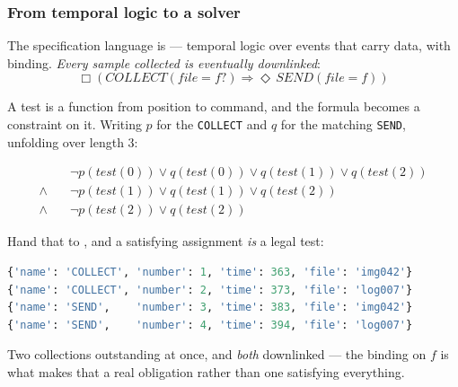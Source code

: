 \begin{frame}[fragile]
  \frametitle{From temporal logic to a solver} \small

The specification language is {\bf \matl{}} --- temporal logic over events that
carry data, with binding. {\em Every sample collected is eventually downlinked}:
\[
\Box (\mathit{COLLECT}(file=f?) \Rightarrow \Diamond\, \mathit{SEND}(file=f))
\]

\pause
\vspace{-0.1cm}

A test is a function from position to command, and the formula becomes a constraint
on it. Writing $p$ for the {\tt COLLECT} and $q$ for the matching {\tt SEND},
unfolding over length 3:

\vspace{-0.2cm}

\begin{align*}
&\neg p(test(0)) \vee q(test(0)) \vee q(test(1)) \vee q(test(2)) \\
\wedge\quad &\neg p(test(1)) \vee q(test(1)) \vee q(test(2)) \\
\wedge\quad &\neg p(test(2)) \vee q(test(2))
\end{align*}

\vspace{-0.15cm}

\pause

Hand that to {\bf \zthree{}}, and a satisfying assignment {\em is} a legal test:

\begin{lstlisting}[language=python]
{'name': 'COLLECT', 'number': 1, 'time': 363, 'file': 'img042'}
{'name': 'COLLECT', 'number': 2, 'time': 373, 'file': 'log007'}
{'name': 'SEND',    'number': 3, 'time': 383, 'file': 'img042'}
{'name': 'SEND',    'number': 4, 'time': 394, 'file': 'log007'}
\end{lstlisting}

\vspace{-0.15cm}

Two collections outstanding at once, and {\em both} downlinked --- the binding on
$f$ is what makes that a real obligation rather than one  satisfying
everything.

\end{frame}
